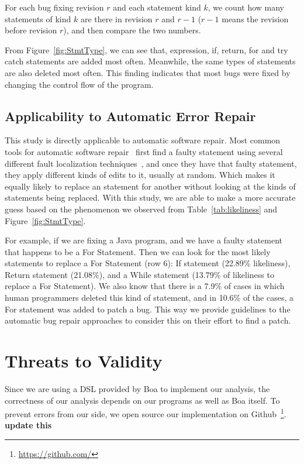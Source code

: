 \documentclass{sig-alternate-05-2015}
\newcommand{\todo}[1]
  {{\scriptsize \textbf{\color{red} {#1}}}}
\begin{document}
For each bug fixing revision $r$ and each statement kind $k$, we count how many
statements of kind $k$ are there in revision $r$ and $r-1$ ($r-1$ means the
revision before revision $r$), and then compare the two numbers. 

From Figure~\ref{fig:StmtType}, we can see that, expression, if, return, for and
try catch statements are added most often. Meanwhile, the same types of
statements are also deleted most often. This finding indicates that most bugs
were fixed by changing the control flow of the program.


\subsection{Applicability to Automatic Error Repair} 

This study is directly applicable to automatic software repair. Most common
tools for automatic software repair~\cite{kim2013,legoues2012} first
find a faulty statement using several different fault localization
techniques~\cite{fry2010}, and once they have that faulty statement, they apply
different kinds of edits to it, usually at random. Which makes it equally likely
to replace an statement for another without looking at the kinds of statements
being replaced. With this study, we are able to make a more accurate guess based
on the phenomenon we observed from Table~\ref{tab:likeliness} and
Figure~\ref{fig:StmtType}.

For example, if we are fixing a Java program, and we have a faulty statement
that happens to be a For Statement. Then we can look for the most likely
statements to replace a For Statement (row 6): If statement (22.89\%
likeliness), Return statement (21.08\%), and a While statement (13.79\% of
likeliness to replace a For Statement). We also know that there is a 7.9\% of
cases in which human programmers deleted this kind of statement, and in 10.6\%
of the cases, a For statement was added to patch a bug. This way we provide
guidelines to the automatic bug repair approaches to consider this on their
effort to find a patch.

\section{Threats to Validity} 

Since we are using a DSL provided by Boa to implement our analysis, the
correctness of our analysis depends on our programs as well as Boa itself. To
prevent errors from our side, we open source our implementation on
Github~\footnote{\url{https://github.com/}}.\todo{update
this}
\end{document}

